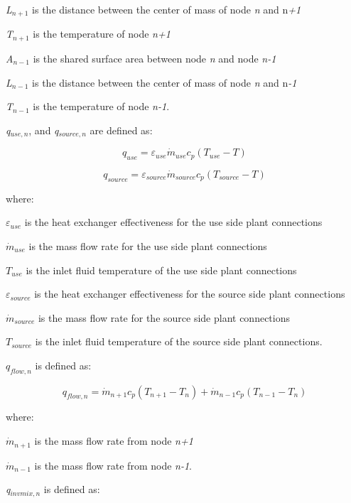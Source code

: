 \emph{L\(_{n+1}\)} is the distance between the center of mass of node \emph{n} and n\emph{+1}

\emph{T\(_{n+1}\)} is the temperature of node \emph{n+1}

\emph{A\(_{n-1}\)} is the shared surface area between node \emph{n} and node \emph{n-1}

\emph{L\(_{n-1}\)} is the distance between the center of mass of node \emph{n} and n\emph{-1}

\emph{T\(_{n-1}\)} is the temperature of node \emph{n-1}.

\emph{q\(_{use,n}\)}, and \emph{q\(_{source,n}\)} are defined as:

\begin{equation}
{q_{use}} = {\varepsilon_{use}}{\dot m_{use}}{c_p}\left( {{T_{use}} - T} \right)
\end{equation}

\begin{equation}
{q_{source}} = {\varepsilon_{source}}{\dot m_{source}}{c_p}\left( {{T_{source}} - T} \right)
\end{equation}

where:

\({\varepsilon_{use}}\) is the heat exchanger effectiveness for the use side plant connections

\({\dot m_{use}}\) is the mass flow rate for the use side plant connections

\(T_{use}\) is the inlet fluid temperature of the use side plant connections

\({\varepsilon_{source}}\) is the heat exchanger effectiveness for the source side plant connections

\({\dot m_{source}}\) is the mass flow rate for the source side plant connections

\(T_{source}\) is the inlet fluid temperature of the source side plant connections.

\(q_{flow,n}\) is defined as:

\begin{equation}
{q_{flow,n}} = {\dot m_{n + 1}}{c_p}({T_{n + 1}} - {T_n}) + {\dot m_{n - 1}}{c_p}({T_{n - 1}} - {T_n})
\end{equation}

where:

\({\dot m_{n + 1}}\) is the mass flow rate from node \emph{n+1}

\({\dot m_{n - 1}}\) is the mass flow rate from node \emph{n-1}.

\emph{q\(_{invmix,n}\)} is defined as:

